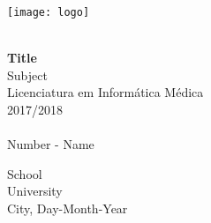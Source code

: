 \begin{titlepage}
    \begin{center}
        \texttt{[image: logo]}

        \vspace*{\fill}
        
        \HRule \\[0.4cm]
        {\huge \bfseries Title}\\
        \vspace{0.5cm}
        \large{Subject}\\
        \vspace{0.4cm}
        \small{Licenciatura em Informática Médica}\\
        \vspace{0.2cm}
        \small{2017/2018}\\
        \HRule \\
        \vspace{0.5cm}
        Number - Name\\[4cm]

        
        
        \vfill
        
        
        
        School\\
        University\\
        City, Day-Month-Year
    \end{center}
\end{titlepage}
